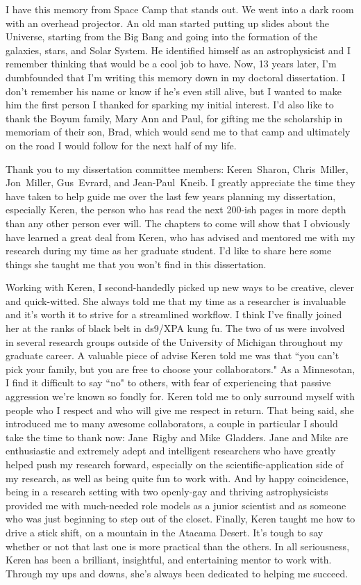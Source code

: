 I have this memory from Space Camp that stands out. We went into a dark room with an overhead projector. An old man started putting up slides about the Universe, starting from the Big Bang and going into the formation of the galaxies, stars, and Solar System. He identified himself as an astrophysicist and I remember thinking that would be a cool job to have. Now, 13 years later, I'm dumbfounded that I'm writing this memory down in my doctoral dissertation. I don't remember his name or know if he's even still alive, but I wanted to make him the first person I thanked for sparking my initial interest. I'd also like to thank the Boyum family, Mary Ann and Paul, for gifting me the scholarship in memoriam of their son, Brad, which would send me to that camp and ultimately on the road I would follow for the next half of my life.

Thank you to my dissertation committee members: Keren~Sharon, Chris~Miller, Jon~Miller, Gus~Evrard, and Jean-Paul~Kneib. I greatly appreciate the time they have taken to help guide me over the last few years planning my dissertation, especially Keren, the person who has read the next 200-ish pages in more depth than any other person ever will. The chapters to come will show that I obviously have learned a great deal from Keren, who has advised and mentored me with my research during my time as her graduate student. I'd like to share here some things she taught me that you won't find in this dissertation.

Working with Keren, I second-handedly picked up new ways to be creative, clever and quick-witted. She always told me that my time as a researcher is invaluable and it's worth it to strive for a streamlined workflow. I think I've finally joined her at the ranks of black belt in ds9/XPA kung fu. The two of us were involved in several research groups outside of the University of Michigan throughout my graduate career. A valuable piece of advise Keren told me was that ``you can't pick your family, but you are free to choose your collaborators." As a Minnesotan, I find it difficult to say ``no" to others, with fear of experiencing that passive aggression we're known so fondly for. Keren told me to only surround myself with people who I respect and who will give me respect in return. That being said, she introduced me to many awesome collaborators, a couple in particular I should take the time to thank now: Jane~Rigby and Mike~Gladders. Jane and Mike are enthusiastic and extremely adept and intelligent researchers who have greatly helped push my research forward, especially on the scientific-application side of my research, as well as being quite fun to work with. And by happy coincidence, being in a research setting with two openly-gay and thriving astrophysicists provided me with much-needed role models as a junior scientist and as someone who was just beginning to step out of the closet. Finally, Keren taught me how to drive a stick shift, on a mountain in the Atacama Desert. It's tough to say whether or not that last one is more practical than the others. In all seriousness, Keren has been a brilliant, insightful, and entertaining mentor to work with. Through my ups and downs, she's always been dedicated to helping me succeed.

